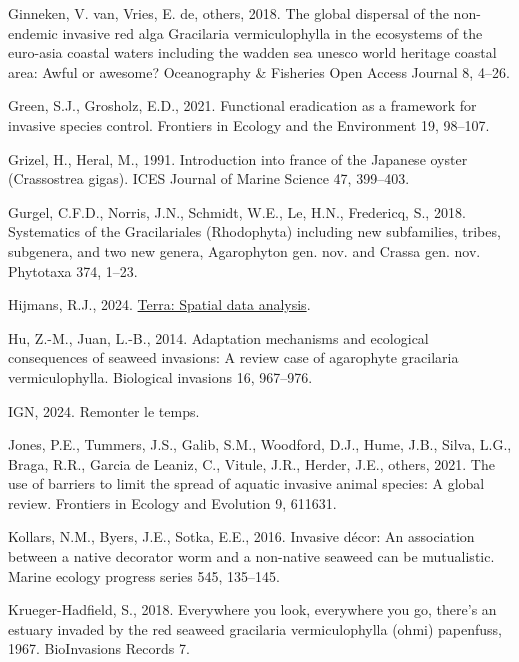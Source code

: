 \documentclass[
  letterpaper,
  DIV=11,
  numbers=noendperiod]{scrartcl}
\newlength{\cslhangindent}
\newenvironment{CSLReferences}[2] %
 {\begin{list}{}{%
  \setlength{\itemindent}{0pt}
  \setlength{\leftmargin}{0pt}
  \setlength{\parsep}{0pt}
  \ifodd #1
   \setlength{\leftmargin}{\cslhangindent}
   \setlength{\itemindent}{-1\cslhangindent}
  \fi
  \setlength{\itemsep}{#2\baselineskip}}}
 {\end{list}}
\begin{document}
\begin{CSLReferences}{1}{0}
Ginneken, V. van, Vries, E. de, others, 2018. The global dispersal of
the non-endemic invasive red alga {G}racilaria vermiculophylla in the
ecosystems of the euro-asia coastal waters including the wadden sea
unesco world heritage coastal area: Awful or awesome? Oceanography \&
Fisheries Open Access Journal 8, 4--26.

Green, S.J., Grosholz, E.D., 2021. Functional eradication as a framework
for invasive species control. Frontiers in Ecology and the Environment
19, 98--107.

Grizel, H., Heral, M., 1991. Introduction into france of the {J}apanese
oyster ({C}rassostrea gigas). ICES Journal of Marine Science 47,
399--403.

Gurgel, C.F.D., Norris, J.N., Schmidt, W.E., Le, H.N., Fredericq, S.,
2018. Systematics of the {G}racilariales ({R}hodophyta) including new
subfamilies, tribes, subgenera, and two new genera, {A}garophyton gen.
{n}ov. {a}nd {C}rassa gen. nov. Phytotaxa 374, 1--23.

Hijmans, R.J., 2024.
\href{https://CRAN.R-project.org/package=terra}{Terra: Spatial data
analysis}.

Hu, Z.-M., Juan, L.-B., 2014. Adaptation mechanisms and ecological
consequences of seaweed invasions: A review case of agarophyte
gracilaria vermiculophylla. Biological invasions 16, 967--976.

IGN, 2024. Remonter le temps.

Jones, P.E., Tummers, J.S., Galib, S.M., Woodford, D.J., Hume, J.B.,
Silva, L.G., Braga, R.R., Garcia de Leaniz, C., Vitule, J.R., Herder,
J.E., others, 2021. The use of barriers to limit the spread of aquatic
invasive animal species: A global review. Frontiers in Ecology and
Evolution 9, 611631.

Kollars, N.M., Byers, J.E., Sotka, E.E., 2016. Invasive d{é}cor: An
association between a native decorator worm and a non-native seaweed can
be mutualistic. Marine ecology progress series 545, 135--145.

Krueger-Hadfield, S., 2018. Everywhere you look, everywhere you go,
there's an estuary invaded by the red seaweed gracilaria vermiculophylla
(ohmi) papenfuss, 1967. BioInvasions Records 7.


\end{CSLReferences}
\end{document}
